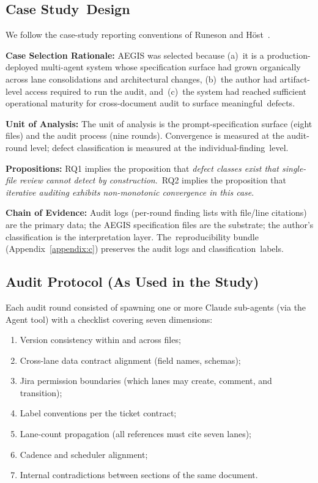 \documentclass[software,article,accept,pdftex,oneauthor]{Definitions/mdpi}
\def\hl#1{#1}
\begin{document}
\subsection{Case Study~Design}

We follow the case-study reporting conventions of Runeson and H{\"o}st~\cite{runeson2009guidelines}.

\textbf{\hl{Case Selection Rationale:}} AEGIS was selected because (a)~it is a production-deployed multi-agent system whose specification surface had grown organically across lane consolidations and architectural changes, (b)~the author had artifact-level access required to run the audit, and~(c)~the system had reached sufficient operational maturity for cross-document audit to surface meaningful~defects.

\textbf{\hl{Unit of Analysis:}} The unit of analysis is the prompt-specification surface (eight files) and the audit process (nine rounds). Convergence is measured at the audit-round level; defect classification is measured at the individual-finding~level.

\textbf{\hl{Propositions:}} RQ1 implies the proposition that \emph{\hl{defect classes exist that single-file review cannot detect by construction}}.~RQ2 implies the proposition that \emph{\hl{iterative auditing exhibits non-monotonic convergence in this case}}.

\textbf{\hl{Chain of Evidence:}} Audit logs (per-round finding lists with file/line citations) are the primary data; the AEGIS specification files are the substrate; the author's classification is the interpretation layer. The~reproducibility bundle (Appendix~\ref{appendix:c}) preserves the audit logs and classification~labels.

\subsection{Audit Protocol (As Used in the Study)}
\label{subsec:audit-protocol}

Each audit round consisted of spawning one or more Claude sub-agents (via the Agent tool) with a checklist covering seven dimensions:

\begin{enumerate}
\item Version consistency within and across files;
\item Cross-lane data contract alignment (field names, schemas);
\item Jira permission boundaries (which lanes may create, comment, and transition);
\item Label conventions per the ticket contract;
\item Lane-count propagation (all references must cite seven lanes);
\item Cadence and scheduler alignment;
\item Internal contradictions between sections of the same document.
\end{enumerate}
\end{document}
